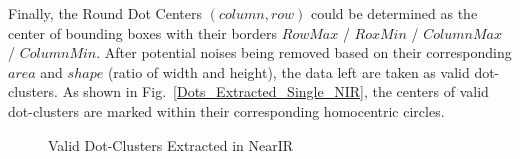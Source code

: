 %
Finally, the Round Dot Centers \((column, row)\) could be determined as the center of bounding boxes with their borders \(RowMax\) / \(RoxMin\) / \(ColumnMax\) / \(ColumnMin\). After potential noises being removed based on their corresponding \(area\) and \(shape\) (ratio of width and height), the data left are taken as valid dot-clusters. As shown in Fig.~\ref{Dots_Extracted_Single_NIR}, the centers of valid dot-clusters are marked within their corresponding homocentric circles.
%
 \begin{figure}[t]
\hspace*{-0.5cm}
\centering
{}
{}
%
\caption{Valid Dot-Clusters Extracted in \gls{NearIR}}
\label{DotCentersExtraction}
\end{figure}
